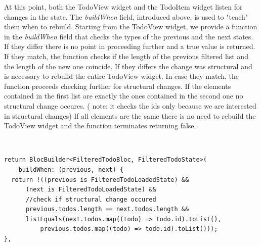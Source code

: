 At this point, both the TodoView widget and the TodoItem widget listen for changes in the state. The \textit{buildWhen} field, introduced above,  is used to "teach" them when to rebuild. Starting from the TodoView widget, we provide a function in the \textit{buildWhen} field that checks the types of the previous and the next states. If they differ there is no point in proceeding further and a true value is returned. If they match, the function checks if the length of the previous filtered list and the length of the new one coincide. If they differs the change was structural and is necessary to rebuild the entire TodoView widget. In case they match, the function proceeds checking further for structural changes. If the elements contained in the first list are exactly the ones contained in the second one no structural change occures. ( note: it checks the ids only because we are interested in structural changes) If all elements are the same there is no need to rebuild the TodoView widget and the function terminates returning false.
\begin{code}
\mbox{}\\
 \mbox{}
\label{code:2.14}
\begin{verbatim}
return BlocBuilder<FilteredTodoBloc, FilteredTodoState>(
    buildWhen: (previous, next) {
  return !((previous is FilteredTodoLoadedState) &&
      (next is FilteredTodoLoadedState) &&
      //check if structural change occured
      previous.todos.length == next.todos.length &&
      listEquals(next.todos.map((todo) => todo.id).toList(),
          previous.todos.map((todo) => todo.id).toList()));
},
\end{verbatim}
\mbox{}
\end{code}

